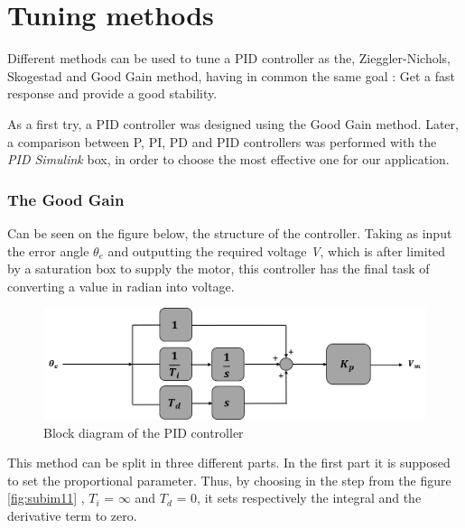 \section{Tuning methods}
Different methods can be used to tune a PID controller as the, Zieggler-Nichols, Skogestad and Good Gain method, having in common the same goal : Get a fast response and provide a good stability.\par
As a first try, a PID controller was designed using the Good Gain method. Later, a comparison between P, PI, PD and PID controllers was performed with the \emph{PID Simulink} box, in order to choose the most effective one for our application.\par 	

\subsubsection{The Good Gain}


Can be seen on the figure below, the structure of the controller. Taking as input the error angle \textbf{$\theta_{e}$} and outputting the required voltage \textit{V}, which is after limited by a saturation box to supply the motor, this controller has the final task of converting a value in radian into voltage.\par

\begin{figure}[H]
  \centering
  \includegraphics[scale=0.5]{figures/controller_model.png}
  \caption[LABEL] {Block diagram of the PID controller}
\end{figure}
  

  
    


 This method can be split in three different parts. In the first part it is supposed to set the proportional parameter. Thus, by choosing in the step from the figure \ref{fig:subim11} , $T_i$ = $\infty$ and $T_d$ = 0, it sets respectively the integral and the derivative term to zero.

